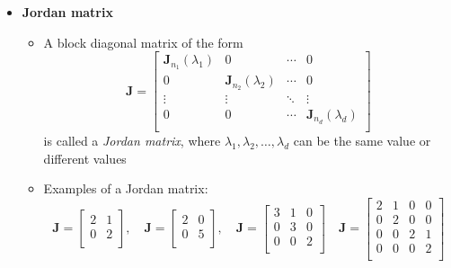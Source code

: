 \documentclass[12pt,a4paper]{article}
\begin{document}
\begin{itemize}
\item \textbf{Jordan matrix}
  \begin{itemize}
  \item A block diagonal matrix of the form
    \begin{equation}\nonumber%
      \bm{J} =
      \begin{bmatrix}
        \bm{J}_{n_{1}}(\lambda_{1}) & 0 & \cdots & 0 \\
        0 & \bm{J}_{n_{2}}(\lambda_{2}) & \cdots & 0 \\
        \vdots & \vdots & \ddots & \vdots \\
        0 & 0 & \cdots & \bm{J}_{n_{d}}(\lambda_{d}) \\
      \end{bmatrix}
    \end{equation}
    is called a \emph{Jordan matrix},
    where $\lambda_{1}, \lambda_{2},\ldots, \lambda_{d}$ can be the same value or different values
  \item Examples of a Jordan matrix:
    \begin{equation}\nonumber%
      \bm{J} =
      \begin{bmatrix}
        2 & 1 \\
        0 & 2 \\
      \end{bmatrix},
      \quad
      \bm{J} =
      \begin{bmatrix}
        2 & 0 \\
        0 & 5 \\
      \end{bmatrix},
      \quad
      \bm{J} =
      \begin{bmatrix}
        3 & 1 & 0 \\
        0 & 3 & 0 \\
        0 & 0 & 2 \\
      \end{bmatrix}
      \quad
      \bm{J} =
      \begin{bmatrix}
        2 & 1 & 0 & 0 \\
        0 & 2 & 0 & 0 \\
        0 & 0 & 2 & 1 \\
        0 & 0 & 0 & 2 \\
      \end{bmatrix}
    \end{equation}
  \end{itemize}

\end{itemize}
\end{document}
